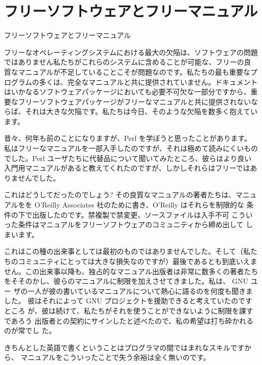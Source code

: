 \chapter[フリーソフトウェアとフリーマニュアル]
   {{\huge フリーソフトウェアとフリーマニュアル}}
{フリーソフトウェアとフリーマニュアル}

\begingroup
\small
\begin{multicols}{2}

フリーなオペレーティングシステムにおける最大の欠陥は、ソフトウェアの問題
ではありません\zdash 私たちがこれらのシステムに含めることが可能な、フリーの良
質なマニュアルが不足していることこそが問題なのです。私たちの最も重要なプ
ログラムの多くは、完全なマニュアルと共に提供されていません。ドキュメント
はいかなるソフトウェアパッケージにおいても必要不可欠な一部分ですから、重
要なフリーソフトウェアパッケージがフリーなマニュアルと共に提供されないな
らば、それは大きな欠陥です。私たちは今日、そのような欠陥を数多く抱えてい
ます。 

昔々、何年も前のことになりますが、Perl を学ぼうと思ったことがあります。
私はフリーなマニュアルを一部入手したのですが、それは極めて読みにくいもの
でした。Perl ユーザたちに代替品について聞いてみたところ、彼らはより良い
入門用マニュアルがあると教えてくれたのですが、しかしそれらはフリーではあ
りませんでした。 

これはどうしてだったのでしょう? その良質なマニュアルの著者たちは、マニュ
アルをを O'Reilly Associates 社のために書き、O'Reilly はそれらを制限的な
条件の下で出版したのです。禁複製で禁変更、ソースファイルは入手不可\zdash
こういった条件はマニュアルをフリーソフトウェアのコミュニティから締め出して
しまいます。 

これはこの種の出来事としては最初のものではありませんでした。そして（私た
ちのコミュニティにとっては大きな損失なのですが）最後であるとも到底いえま
せん。この出来事以降も、独占的なマニュアル出版者は非常に数多くの著者たち
をそそのかし、彼らのマニュアルに制限を加えさせてきました。私は、 GNU ユー
ザの一人が彼の書いているマニュアルについて熱心に語るのを何度も聞きました。
彼はそれによって GNU プロジェクトを援助できると考えていたのです\zdash ところ
が、彼は続けて、私たちがそれを使うことができないように制限を課すであろう
出版者との契約にサインしたと述べたので、私の希望は打ち砕かれるのが常でし
た。 

きちんとした英語で書くということはプログラマの間ではまれなスキルですから、
マニュアルをこういったことで失う余裕は全く無いのです。 


\end{multicols}

